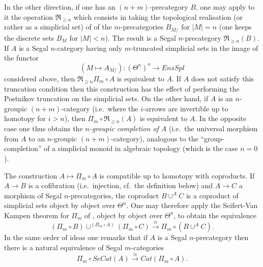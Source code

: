 In the other direction, if one has an $(n+m)$-precategory $B$, one may apply to
it
the operation $\Re _{\geq n}$ which consists in taking the topological
realisation (or rather as a simplicial set) of \cite{Tamsamani} of the
$m$-precategories $B_{M/}$ for $|M|=n$ (one keeps the discrete sets $B_M$ for
$|M|<n$). The result is a Segal $n$-precategory
$\Re _{\geq n}(B)$. If $A$ is a Segal $n$-category having only
$m$-truncated simplicial sets in the image of the functor
$$
(M\mapsto A_{M/}): (\Theta ^n )^o\rightarrow EnsSpl
$$
considered above, then $\Re _{\geq n}\Pi _m\circ A$ is
equivalent to
$A$. If $A$
does not satisfy this truncation condition then this construction has
the effect
of performing the Postnikov truncation on the simplicial sets.
On the other hand,
if $A$ is an $n$-groupic $(n+m)$-category (i.e.\ where the $i$-arrows are
invertible up to homotopy for $i>n$), then $\Pi _m\circ \Re _{\geq
n}(A)$
is equivalent to $A$. In the opposite case one thus obtains the
{\em $n$-groupic completion of $A$} (i.e.\ the universal morphism
from $A$ to an $n$-groupic $(n+m)$-category),
analogous to the ``group-completion'' of a
simplicial monoid in algebraic topology (which is the case $n=0$).

The construction $A\mapsto \Pi _{m}\circ A$ is compatible up to homotopy
with coproducts. If $A\rightarrow B$ is a cofibration (i.e.\ injection,
cf.\ the definition below) and $A\rightarrow C$ a morphism of Segal
$n$-precategories, the coproduct $B\cup ^AC$ is a coproduct of simplicial sets
object by object over $\Theta ^n$. One may therefore apply the
Seifert-Van Kampen theorem for $\Pi _m$ of \cite{nCAT}, object by object over
$\Theta ^n$, to obtain the equivalence
$$
(\Pi _m \circ B)\cup ^{(\Pi _m \circ A)}(\Pi _m \circ C)
\stackrel{\cong}{\rightarrow}
\Pi _m \circ (B\cup ^AC).
$$
In the same order of ideas one remarks that if $A$ is a Segal $n$-precategory
then there is a natural equivalence of Segal $m$-categories
$$
\Pi _m \circ SeCat(A) \stackrel{\cong}{\rightarrow} Cat(\Pi _m \circ A).
$$



